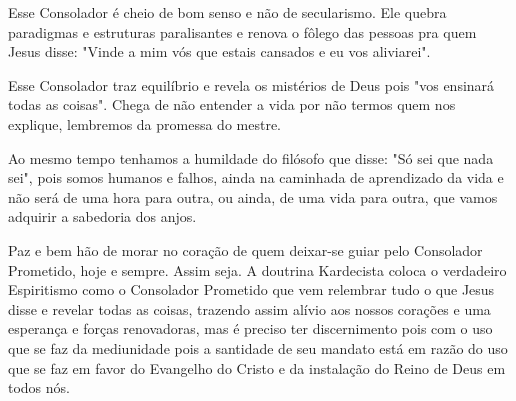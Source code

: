 \emdash{}Esse Consolador é cheio de bom senso e não de secularismo. Ele quebra paradigmas e estruturas paralisantes e renova o fôlego das pessoas pra quem Jesus disse: "Vinde a mim vós que estais cansados e eu vos aliviarei".

\emdash{}Esse Consolador traz equilíbrio e revela os mistérios de Deus pois "vos ensinará todas as coisas". Chega de não entender a vida por não termos quem nos explique, lembremos da promessa do mestre.


\emdash{}Ao mesmo tempo tenhamos a humildade do filósofo que disse: "Só sei que nada sei", pois somos humanos e falhos, ainda na caminhada de aprendizado da vida e não será de uma hora para outra, ou ainda, de uma vida para outra, que vamos adquirir a sabedoria dos anjos.

\emdash{}Paz e bem hão de morar no coração de quem deixar-se guiar pelo Consolador Prometido, hoje e sempre. Assim seja. A doutrina Kardecista coloca o verdadeiro Espiritismo como o Consolador Prometido que vem relembrar tudo o que Jesus disse e revelar todas as coisas, trazendo assim alívio aos nossos corações e uma esperança e forças renovadoras, mas é preciso ter discernimento pois com o uso que se faz da mediunidade pois a santidade de seu mandato está em razão do uso que se faz em favor do Evangelho do Cristo e da instalação do Reino de Deus em todos nós.